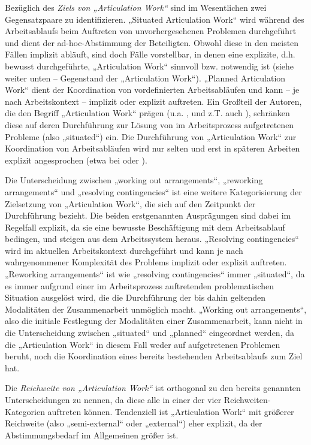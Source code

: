 Bezüglich des \emph{Ziels von „Articulation Work“} sind im Wesentlichen zwei Gegensatzpaare zu identifizieren. „Situated Articulation Work“ wird während des Arbeitsablaufs beim Auftreten von unvorhergesehenen Problemen durchgeführt und dient der ad-hoc-Abstimmung der Beteiligten. Obwohl diese in den meisten Fällen implizit abläuft, sind doch Fälle vorstellbar, in denen eine explizite, d.h. bewusst durchgeführte, „Articulation Work“ sinnvoll bzw. notwendig ist (siehe weiter unten -- Gegenstand der „Articulation Work“). „Planned Articulation Work“ dient der Koordination von vordefinierten Arbeitsabläufen und kann -- je nach Arbeitskontext -- implizit oder explizit auftreten. Ein Großteil der Autoren, die den Begriff „Articulation Work“ prägen (u.a. \citep{Strauss85}, \citep{Gerson86} und z.T. auch \citep{Schmidt92}), schränken diese auf deren Durchführung zur Lösung von im Arbeitsprozess aufgetretenen Probleme (also „situated“) ein. Die Durchführung von „Articulation Work“ zur Koordination von Arbeitsabläufen wird nur selten und erst in späteren Arbeiten explizit angesprochen (etwa bei \citep{Grinter96} oder \citep{Fjuk97}). 

Die Unterscheidung zwischen „working out arrangements“, „reworking arrangements“ und „resolving contingencies“ ist eine weitere Kategorisierung der Zielsetzung von „Articulation Work“, die sich auf den Zeitpunkt der Durchführung bezieht. Die beiden erstgenannten Ausprägungen sind dabei im Regelfall explizit, da sie eine bewusste Beschäftigung mit dem Arbeitsablauf bedingen, und steigen aus dem Arbeitssystem heraus. „Resolving contingencies“ wird im aktuellen Arbeitskontext durchgeführt und kann je nach wahrgenommener Komplexität des Problems implizit oder explizit auftreten. „Reworking arrangements“ ist wie „resolving contingencies“ immer „situated“, da es immer aufgrund einer im Arbeitsprozess auftretenden problematischen Situation ausgelöst wird, die die Durchführung der bis dahin geltenden Modalitäten der Zusammenarbeit unmöglich macht. „Working out arrangements“, also die initiale Festlegung der Modalitäten einer Zusammenarbeit, kann nicht in die Unterscheidung zwischen „situated“ und „planned“ eingeordnet werden, da die „Articulation Work“ in diesem Fall weder auf aufgetretenen Problemen beruht, noch die Koordination eines bereits bestehenden Arbeitsablaufs zum Ziel hat.

Die \emph{Reichweite von „Articulation Work“} ist orthogonal zu den bereits genannten Unterscheidungen zu nennen, da diese alle in einer der vier Reichweiten-Kategorien auftreten können. Tendenziell ist „Articulation Work“ mit größerer Reichweite (also „semi-external“ oder „external“) eher explizit, da der Abstimmungsbedarf im Allgemeinen größer ist.

